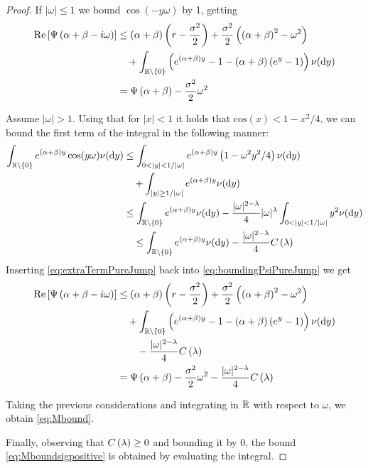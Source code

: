 \documentclass[11pt]{amsart}
\begin{document}
\begin{theorem}
\begin{proof}
If $|\omega| \leq 1$ we bound $\cos(-y \omega)$ by 1, getting
\begin{align}
\notag \mathrm{Re}\left[\Psi \left( {{ \alpha +\beta - i \omega}} \right)\right] &\leq \left( {\alpha + \beta} \right) \left( {r-\frac{\sigma^2}{2}} \right)+\frac{\sigma^2}{2}\left( {\left( {\alpha +\beta} \right)^2 - \omega^2} \right) \\
\notag &\quad +\int_{\mathbb{R} \setminus \left\lbrace {0} \right\rbrace} \left( {e^{\left( {\alpha + \beta} \right) y} -1-\left( {\alpha + \beta} \right) \left( {e^{y}-1} \right)} \right) \nu(\textrm{d} y)  \\
& = \Psi \left( {{\alpha+\beta}} \right) -\frac{\sigma^2}{2}\omega^2 \label{eq:Psibound}
\end{align}

Assume $| \omega| > 1$.
Using that for $|x| < 1$ it holds that $\textrm{cos}(x) < 1 - x^2 / 4$, we can bound the first term of the integral in the 
following manner:
\begin{align}
\notag \int_{\rz} \expfs{\parent{\damp + \beta} y} \cos(y\omega) \nu(\d y) & \leq
\int_{0<|y| < 1/|\omega|} \expfs{\parent{\damp + \beta} y} \left( 1 - \omega^2 y^2 / 4 \right)  \nu(\d y) \\
\notag & \quad + 
\int_{|y| \geq  1/|\omega|} \expfs{\parent{\damp + \beta} y}  \nu(\d y) \\
\notag & 
\leq \int_{\rz} \expfs{\parent{\damp + \beta} y}  \nu(\d y) 
- \frac{|\omega|^{2 - \lambda}}{4} | \omega |^{\lambda} \int_{0<|y| < 1 / |\omega|} y^2 \nu(\d y)  \\
\label{eq:extraTermPureJump} & 
\quad 
\leq \int_{\rz} \expfs{\parent{\damp + \beta} y}  \nu(\d y) 
- \frac{|\omega|^{2 - \lambda}}{4} \cl
\end{align}
Inserting \eqref{eq:extraTermPureJump} back into \eqref{eq:boundingPsiPureJump} we get
\begin{align*}
\notag 
\mathrm{Re}\left[\Psi \left( {{ \alpha +\beta - i \omega}} \right)\right] & \leq \left( {\alpha + \beta} \right) \left( {r-\frac{\sigma^2}{2}} \right)+\frac{\sigma^2}{2}\left( {\left( {\alpha +\beta} \right)^2 - \omega^2} \right) \\
\notag &\quad + \int_{\mathbb{R} \setminus \left\lbrace {0} \right\rbrace} \left( {e^{\left( {\alpha + \beta} \right) y} -1-\left( {\alpha + \beta} \right) \left( {e^{y}-1} \right)} \right) \nu(\textrm{d} y) \\
\notag & \quad \quad - \frac{|\omega|^{2 - \lambda}}{4} C \left( {\lambda} \right)    \\
& = \Psi \left( {{\alpha+\beta}} \right) -\frac{\sigma^2}{2}\omega^2 - \frac{|\omega|^{2 - \lambda}}{4} C \left( {\lambda} \right)
\end{align*}


Taking the previous considerations and integrating in $\mathbb{R}$ with respect to $\omega$, we obtain \eqref{eq:Mbound}. 

Finally, observing that  $C \left( {\lambda} \right)\geq 0$ and bounding it by 0, the bound \eqref{eq:Mboundsigpositive} is obtained by evaluating the integral.
\end{proof}
\end{theorem}
\end{document}
